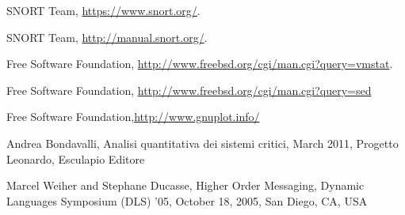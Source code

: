 \documentclass[10pt,a4paper]{article}
\begin{document}
    \begin{thebibliography}{9}

      SNORT Team,
      \url{https://www.snort.org/}.

      SNORT Team,
      \url{http://manual.snort.org/}.

      Free Software Foundation,
      \url{http://www.freebsd.org/cgi/man.cgi?query=vmstat}.

      Free Software Foundation,
      \url{http://www.freebsd.org/cgi/man.cgi?query=sed}

     Free Software
      Foundation,\url{http://www.gnuplot.info/}

     Andrea Bondavalli, Analisi quantitativa dei
      sistemi critici, March 2011, Progetto Leonardo, Esculapio
      Editore

     Marcel Weiher and Stephane Ducasse,
      Higher Order Messaging, Dynamic Languages Symposium (DLS) '05,
      October 18, 2005, San Diego, CA, USA


    \end{thebibliography}
\end{document}
